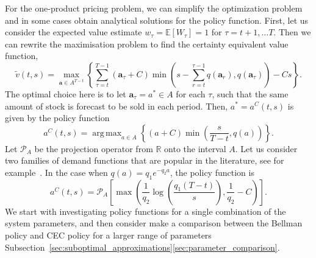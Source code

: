 \documentclass{rsproca_new}
\DeclareMathOperator*{\argmax}{arg\,max}
\theoremstyle{definition}
\begin{document}
For the one-product pricing problem, we can simplify the optimization
problem and in some cases obtain analytical solutions for the policy function.
First, let us consider the expected value estimate $w_\tau=\mathbb E
[W_\tau]=1$ for $\tau=t+1,\dots T$.
Then we can rewrite the maximisation problem to find
the certainty equivalent value function,
\begin{equation}
  \widetilde{v}(t,s)=
  \max_{\mathbf a\in A^{T-t}}\left\{\sum_{\tau=t}^{T-1}(\mathbf
    a_\tau+C)\min\left(s-\sum_{r=t}^{\tau-1}q(\mathbf a_r),q(\mathbf a_\tau)\right)-Cs\right\}.
\end{equation}
The optimal choice here is to let $\mathbf a_\tau=a^*\in A$ for each
$\tau$, such that the same amount of stock is forecast to be sold in
each period.
Then, $a^*=a^C(t,s)$ is given by the policy function
\begin{equation}
  a^C(t,s)=\argmax_{a\in A} \left\{(a+C)\min\left(
      \frac{s}{T-t},q(a)
    \right)\right\}.
\end{equation}
Let $\mathcal P_A$ be the projection operator from $\mathbb R$ onto the interval $A$.
Let us consider two families of demand functions that are
popular in the literature, see for example~\cite[Ch.~7]{talluri2006theory}.
In the case when $q(a)=q_1e^{-q_2a}$, the policy function is
\begin{equation}\label{eq:cec_policy}
  a^C(t,s)=\mathcal P_A\left[
    \max\left( \frac{1}{q_2}\log\left( \frac{q_1(T-t)}{s}\right),
      \frac{1}{q_2}-C  \right)\right].
\end{equation}
We start with investigating policy functions for a
single combination of the  system
parameters, and then consider make a
comparison between the Bellman policy and CEC policy for a larger
range of parameters Subsection~\ref{sec:suboptimal_approximations}\ref{sec:parameter_comparison}.
\end{document}
